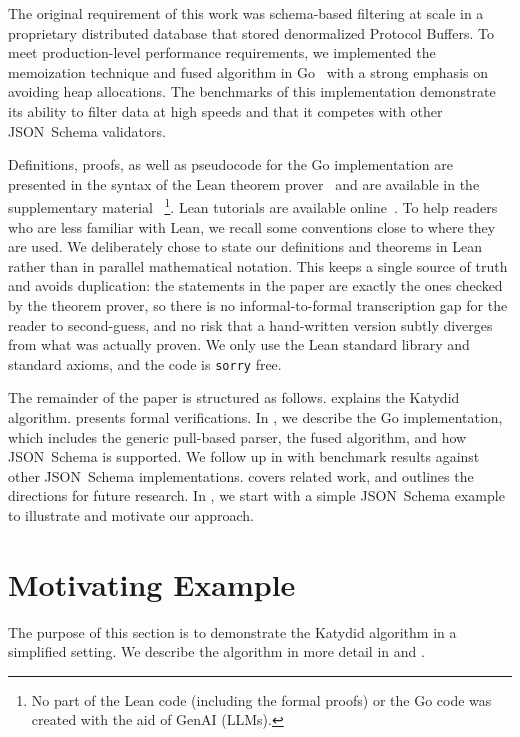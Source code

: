 \documentclass[runningheads]{llncs}
\newcommand{\JSONSchema}{%
  JSON~Schema\xspace%
}
\newcommand{\supplementarymaterial}{%
  supplementary material\xspace%
}
\begin{document}
The original requirement of this work was schema-based filtering at scale in a proprietary distributed database that stored denormalized Protocol Buffers.
To meet production-level performance requirements, we implemented the memoization technique and fused algorithm in Go~\cite{golang} with a strong emphasis on avoiding heap allocations.
The benchmarks of this implementation demonstrate its ability to filter data at high speeds and that it competes with other \JSONSchema validators.

Definitions, proofs, as well as pseudocode for the Go implementation are presented in the syntax of the Lean theorem prover~\cite{lean4} and are available in the \supplementarymaterial~\footnote{No part of the Lean code (including the formal proofs) or the Go code was created with the aid of GenAI (LLMs).}.
Lean tutorials are available online~\cite{learnlean}.
To help readers who are less familiar with Lean, we recall some conventions close to where they are used.
We deliberately chose to state our definitions and theorems in Lean rather than in parallel mathematical notation.
This keeps a single source of truth and avoids duplication: the statements in the paper are exactly the ones checked by the theorem prover, so there is no informal-to-formal transcription gap for the reader to second-guess, and no risk that a hand-written version subtly diverges from what was actually proven.
We only use the Lean standard library and standard axioms, and the code is \lstinline{sorry} free.

The remainder of the paper is structured as follows. 
 explains the Katydid algorithm.
 presents formal verifications. 
In , we describe the Go implementation, which includes the generic pull-based parser, the fused algorithm, and how \JSONSchema is supported.
We follow up in  with benchmark results against other \JSONSchema implementations.
 covers related work, and  outlines the directions for future research. 
In , we start with a simple \JSONSchema example to illustrate and motivate our approach.

\section{Motivating Example}
\label{section_motivating_example}

The purpose of this section is to demonstrate the Katydid algorithm in a simplified setting.
We describe the algorithm in more detail in  and .
\end{document}
